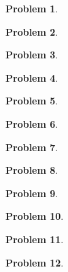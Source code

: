 \documentclass[11pt]{article}
\theoremstyle{definition}
\newtheorem{problem}{Problem}
\newcommand{\fdbox}[2]{\fbox{\sffamily\LARGE\vphantom y#1: \bfseries #2} \par\vspace{1em}} %
\begin{document}
\newcommand{\logo}{%
\begin{minipage}[b]{22em}
\centering\noindent
\\[0.5em]
\begin{minipage}[t][4em][t]{12em} \centering
{\huge \bfseries ${\bf 26^{\text{th}}}$ TJIMO } \\
\textsc{\large Alexandria, Virginia}
\end{minipage}
\end{minipage}
\vspace*{-0.05em}
}
\newcommand{\sevenpoints}{}
\newcommand{\righthead}{\fdbox{Round}{Power}\fdbox{Team Number}{\phantom{00}}}

\begin{problem}
\end{problem}

\eject

\begin{problem}
\end{problem}

\eject

\begin{problem}
\end{problem}

\eject
\begin{problem}
\end{problem}

\eject
\begin{problem}
\end{problem}

\eject
\begin{problem}
\end{problem}

\eject
\begin{problem}
\end{problem}

\eject

\begin{problem}
\end{problem}

\eject

\begin{problem}
\end{problem}

\eject
\begin{problem}
\end{problem}

\eject
\begin{problem}
\end{problem}

\eject
\begin{problem}
\end{problem}

\eject
\end{document}
